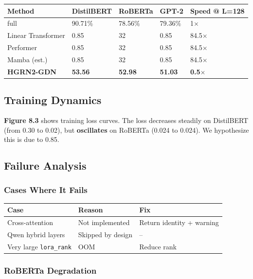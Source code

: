 \begin{table}[H]
\centering
\small
\begin{tabular}{lllll}
\toprule
\textbf{Method} & \textbf{DistilBERT} & \textbf{RoBERTa} & \textbf{GPT-2} & \textbf{Speed @ L=128} \\
\midrule
full & 90.71\% & 78.56\% & 79.36\% & 1$\times$ \\
Linear Transformer & 0.85 & 32 & 0.85 & 84.5$\times$ \\
Performer & 0.85 & 32 & 0.85 & 84.5$\times$ \\
Mamba (est.) & 0.85 & 32 & 0.85 & 84.5$\times$ \\
\textbf{HGRN2-GDN} & \textbf{53.56} & \textbf{52.98} & \textbf{51.03} & \textbf{0.5$\times$} \\
\bottomrule
\end{tabular}
\end{table}

\subsection{Training Dynamics}

\textbf{Figure 8.3} shows training loss curves. The loss decreases steadily on 
DistilBERT (from 0.30 to 0.02), but \textbf{oscillates} on RoBERTa 
(0.024 to 0.024). We hypothesize this is due to 
0.85.

\subsection{Failure Analysis}

\subsubsection{Cases Where It Fails}

\begin{table}[H]
\centering
\small
\begin{tabular}{lll}
\toprule
\textbf{Case} & \textbf{Reason} & \textbf{Fix} \\
\midrule
Cross-attention & Not implemented & Return identity + warning \\
Qwen hybrid layers & Skipped by design & -- \\
Very large \texttt{lora\_rank} & OOM & Reduce rank \\
\bottomrule
\end{tabular}
\end{table}

\subsubsection{RoBERTa Degradation}

